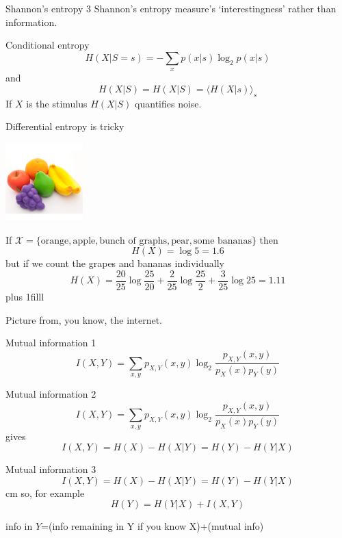 \documentclass{beamer}
\newcommand{\btVFill}{\vskip0pt plus 1filll}
\begin{document}
\begin{frame}{Shannon's entropy 3}
  Shannon's entropy measure's \lq{}interestingness\rq{} rather than information.
\end{frame}

\begin{frame}{Conditional entropy}
\color{dark}
  $$
H(X|S=s)=-\sum_x p(x|s)\log_2{p(x|s)}
$$
\color{black}
and
\color{dark}
$$
H(X|S)=H(X|S)=\langle H(X|s)\rangle_s
$$
\color{black}
If $X$ is the stimulus $H(X|S)$ quantifies noise.
\end{frame}

\begin{frame}{Differential entropy is tricky}
  \begin{center}
    \includegraphics[width=3cm]{lanco_fruits_1.png}
  \end{center}
  If $\mathcal{X}=\{\mbox{orange},\mbox{apple},\mbox{bunch of graphs},\mbox{pear},\mbox{some bananas}\}$ then
\color{dark}
  $$H(X)=\log{5}=1.6$$
\color{black}
but if we count the grapes and bananas individually
\color{dark}
  $$H(X)=\frac{20}{25}\log{\frac{25}{20}}+\frac{2}{25}\log\frac{25}{2}+\frac{3}{25}\log{25}=1.11$$
\color{black}
\btVFill
\color{gray}
\begin{flushright}
\tiny{Picture from, you know, the internet.}
\end{flushright}
\end{frame}

\begin{frame}{Mutual information 1}
\color{dark}
$$
I(X,Y)=\sum_{x,y} p_{X,Y}(x,y) \log_2{\frac{p_{X,Y}(x,y)}{p_X(x)p_Y(y)}}
$$
\color{black}
\end{frame}


\begin{frame}{Mutual information 2}
\color{dark}
$$
I(X,Y)=\sum_{x,y} p_{X,Y}(x,y) \log_2{\frac{p_{X,Y}(x,y)}{p_X(x)p_Y(y)}}
$$
\color{black}
gives
\color{dark}
$$
I(X,Y)=H(X)-H(X|Y)=H(Y)-H(Y|X)
$$
\color{black}
\end{frame}


\begin{frame}{Mutual information 3}
\color{dark}
$$
I(X,Y)=H(X)-H(X|Y)=H(Y)-H(Y|X)
$$
\color{black}
 cm
so, for example
\color{dark}
$$
H(Y)=H(Y|X)+I(X,Y)
$$
\color{black}
\begin{center}
info in $Y$=(info remaining in Y if you know X)+(mutual info)
\end{center}
\end{frame}
\end{document}
